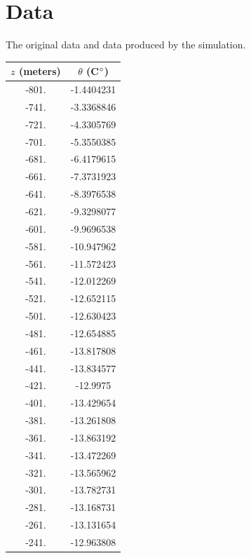 \documentclass{article}%
\begin{document}
    \section{Data}
    The original data and data produced by the simulation. 
    \begin{table}[h!]
        \centering
        \begin{tabular}{c|c}
            $z$ (meters) & $\theta$ (C$\degree$)\\
            \hline
            -801. &  -1.4404231\\
            -741. &  -3.3368846\\
            -721. &  -4.3305769\\
            -701. &  -5.3550385\\
            -681. &  -6.4179615\\
            -661. &  -7.3731923\\
            -641. &  -8.3976538\\
            -621. &  -9.3298077\\
            -601. &  -9.9696538\\
            -581. & -10.947962 \\
            -561. & -11.572423 \\
            -541. & -12.012269 \\
            -521. & -12.652115 \\
            -501. & -12.630423 \\
            -481. & -12.654885 \\
            -461. & -13.817808 \\
            -441. & -13.834577 \\
            -421. & -12.9975   \\
            -401. & -13.429654 \\
            -381. & -13.261808 \\
            -361. & -13.863192 \\
            -341. & -13.472269 \\
            -321. & -13.565962 \\
            -301. & -13.782731 \\
            -281. & -13.168731 \\
            -261. & -13.131654 \\
            -241. & -12.963808 \\

\end{tabular}
\end{table}
\end{document}
